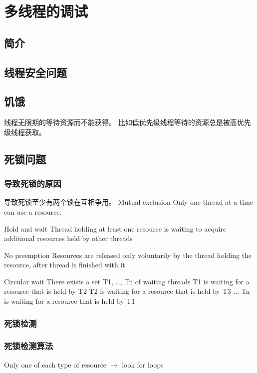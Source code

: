 
\chapter{多线程的调试}
\label{ch_mt} 

\section{简介}

\section{线程安全问题}

\section{饥饿}
线程无限期的等待资源而不能获得。
比如低优先级线程等待的资源总是被高优先级线程获取。

\section{死锁问题} 

\subsection{导致死锁的原因}
导致死锁至少有两个锁在互相争用。
Mutual exclusion
Only one thread at a time can use a resource.

Hold and wait
Thread holding at least one resource is waiting to acquire additional resources held by other threads

No preemption
Resources are released only voluntarily by the thread holding the resource, after thread is finished with it

Circular wait
There exists a set {T1, \ldots, Tn} of waiting threads
  T1 is waiting for a resource that is held by T2
  T2 is waiting for a resource that is held by T3
  ...
  Tn is waiting for a resource that is held by T1

\subsection{死锁检测} 

\subsection{死锁检测算法}
Only one of each type of resource $\rightarrow$ look for loops


